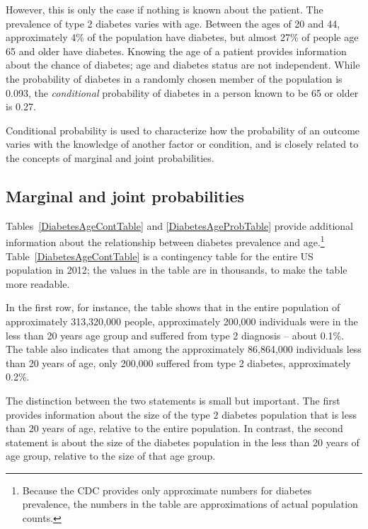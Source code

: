 However, this is only the case if nothing is known about the patient. The prevalence of type 2 diabetes varies with age. Between the ages of 20 and 44, approximately 4\% of the population have diabetes, but almost 27\% of people age 65 and older have diabetes. Knowing the age of a patient provides information about the chance of diabetes; age and diabetes status are not independent. While the probability of diabetes in a randomly chosen member of the population is 0.093, the \textit{conditional} probability of diabetes in a person known to be 65 or older is 0.27.

Conditional probability is used to  characterize how the probability of an outcome varies with the knowledge of another factor or condition, and is closely related to the concepts of marginal and joint probabilities.


\subsection{Marginal and joint probabilities}
\label{marginalAndJointProbabilities}



Tables~\ref{DiabetesAgeContTable} and \ref{DiabetesAgeProbTable} provide additional information about the relationship between diabetes prevalence and age.\footnote{Because the CDC provides only approximate numbers for diabetes prevalence, the numbers in the table are approximations of actual population counts.} Table~\ref{DiabetesAgeContTable} is a contingency table for the entire US population in 2012; the values in the table are in thousands, to make the table more readable.  

In the first row, for instance, the table shows that in the entire population of approximately 313,320,000 people, approximately 200,000 individuals were in the less than 20 years age group and suffered from type 2 diagnosis -- about 0.1\%. The table also indicates that among the approximately 86,864,000 individuals less than 20 years of age, only 200,000 suffered from type 2 diabetes, approximately 0.2\%. 

The distinction between the two statements is small but important. The first provides information about the size of the type 2 diabetes population that is less than 20 years of age, relative to the entire population. In contrast, the second statement is about the size of the diabetes population in the less than 20 years of age group, relative to the size of that age group. 

